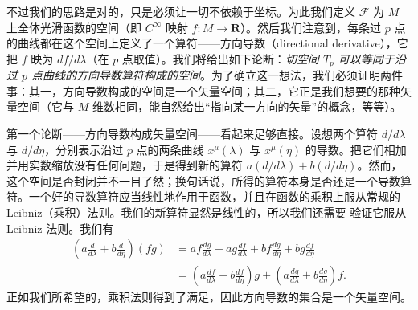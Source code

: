 不过我们的思路是对的，只是必须让一切不依赖于坐标。为此我们定义 $\mathcal{F}$ 为 $M$ 上全体光滑函数的空间（即 $C^\infty$ 映射 $f:M\to\mathbf{R}$）。然后我们注意到，每条过 $p$ 点的曲线都在这个空间上定义了一个算符——方向导数（directional derivative），它把 $f$ 映为 $df/d\lambda$（在 $p$ 点取值）。我们将给出如下论断：\emph{切空间 $T_p$ 可以等同于沿过 $p$ 点曲线的方向导数算符构成的空间}。为了确立这一想法，我们必须证明两件事：其一，方向导数构成的空间是一个矢量空间；其二，它正是我们想要的那种矢量空间（它与 $M$ 维数相同，能自然给出“指向某一方向的矢量”的概念，等等）。

第一个论断——方向导数构成矢量空间——看起来足够直接。设想两个算符 $d/d\lambda$ 与 $d/d\eta$，分别表示沿过 $p$ 点的两条曲线 $x^\mu(\lambda)$ 与 $x^\mu(\eta)$ 的导数。把它们相加并用实数缩放没有任何问题，于是得到新的算符 $a(d/d\lambda)+b(d/d\eta)$。然而，这个空间是否封闭并不一目了然；换句话说，所得的算符本身是否还是一个导数算符。一个好的导数算符应当线性地作用于函数，并且在函数的乘积上服从常规的 Leibniz（乘积）法则。我们的新算符显然是线性的，所以我们还需要
验证它服从 Leibniz 法则。我们有
\begin{align*}
\left(a\frac{d}{d\lambda}+b\frac{d}{d\eta}\right)(fg)&=af\frac{dg}{d\lambda}+ag\frac{df}{d\lambda}+bf\frac{dg}{d\eta}+bg\frac{df}{d\eta}\\
&=\left(a\frac{df}{d\lambda}+b\frac{df}{d\eta}\right)g+\left(a\frac{dg}{d\lambda}+b\frac{dg}{d\eta}\right)f. \tag{2.14}
\end{align*}
正如我们所希望的，乘积法则得到了满足，因此方向导数的集合是一个矢量空间。

